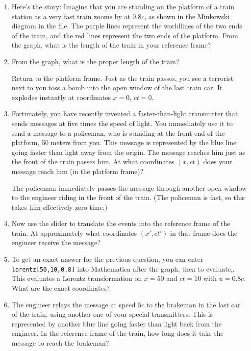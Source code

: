 \begin{enumerate}[wide]
\item Here's the story: Imagine that you are standing on the platform of a train station as a
very fast train zooms by at $0.8c$, as shown in the Minkowski diagram in the file. The purple lines represent the worldlines of the two ends of the train, and the red lines represent the two ends of the platform. From the graph, what is the length of the train in your reference frame?
\answerspace{0.7in}

\item From the graph, what is the proper length of the train?
\answerspace{0.7in}

Return to the platform frame.  Just as the train passes, you see a terrorist next to you toss a bomb into the open window of the last train car. It explodes instantly at coordinates $x = 0$, $ct = 0$.

\item Fortunately, you have recently invented a faster-than-light transmitter that sends messages at five times the speed of light. You immediately use it to send a message to a policeman, who is standing at the front end of the platform, 50 meters from you. This message is represented by the blue line going faster than light away from the origin.  The message reaches him just as the front of the train passes him. At what coordinates $(x,ct)$ does your message reach him (in the platform frame)?
\answerspace{0.7in}

The policeman immediately passes the message through another open window to the engineer riding in the front of the train. (The policeman is fast, so this takes him effectively zero time.)

\item Now use the slider to translate the events into the reference frame of the train. At approximately what coordinates 
$(x', ct')$ in that frame does the engineer receive the message?
\answerspace{0.7in}

\item To get an exact answer for the previous question, you can enter \verb!lorentz[50,10,0.8]!
into Mathematica after the graph, then  to evaluate,.  This evaluates a Lorentz transformation on $x=50$ and $ct=10$ with $u=0.8c$.  What are the exact coordinates?
\answerspace{0.7in}

\item The engineer relays the message at speed $5c$ to the brakeman in the last car of the train, using another one of your special transmitters. This is represented by another blue line going faster than light back from the engineer.  In the reference frame of the train, how long does it take the message to reach the brakeman?
\answerspace{0.7in}


\end{enumerate}
